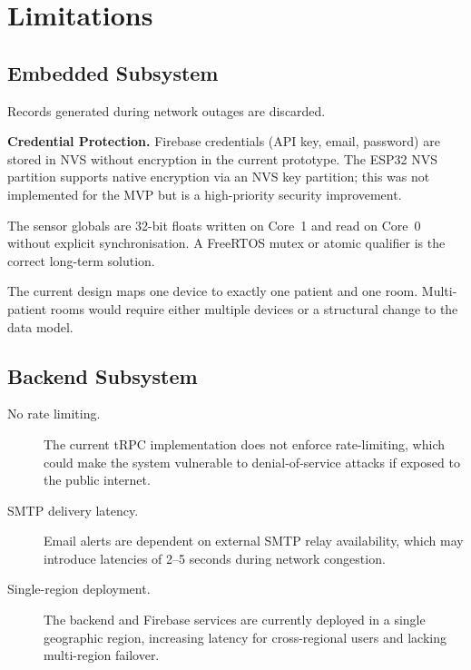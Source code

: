 \section{Limitations}

\subsection{Embedded Subsystem}

\begin{description}
	\item[No local offline buffer.]
	      Records generated during network outages are discarded.

	\item \textbf{Credential Protection.}
	      Firebase\cite{firebase_firestore,firebase_rtdb} credentials (API key, email, password) are stored in NVS without
	      encryption in the current prototype.
	      The ESP32\cite{esp32_datasheet} NVS partition supports native encryption via an NVS key partition;
	      this was not implemented for the MVP but is a high-priority security
	      improvement.

	\item[Implicit shared-memory atomicity.]
	      The sensor globals are 32-bit floats written on Core~1 and read on Core~0
	      without explicit \mbox{synchronisation}.
	      A FreeRTOS mutex or atomic qualifier is the correct long-term solution.

	\item[Single patient per device.]
	      The current design maps one device to exactly one patient and one room.
	      Multi-patient rooms would require either multiple devices or a structural change
	      to the data model.
\end{description}

\subsection{Backend Subsystem}
\begin{description}
	\item[No rate limiting.] The current tRPC implementation does not enforce rate-limiting, which could make the system vulnerable to denial-of-service attacks if exposed to the public internet.
	\item[SMTP delivery latency.] Email alerts are dependent on external SMTP relay availability, which may introduce latencies of 2--5 seconds during network congestion.
	\item[Single-region deployment.] The backend and Firebase\cite{firebase_firestore,firebase_rtdb} services are currently deployed in a single geographic region, increasing latency for cross-regional users and lacking multi-region failover.
\end{description}

